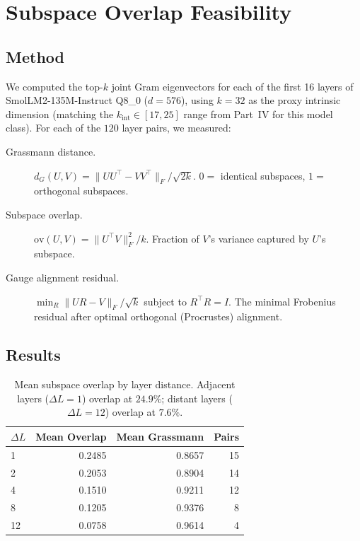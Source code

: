 \documentclass[11pt]{article}
\begin{document}
\section{Subspace Overlap Feasibility}
\label{sec:feasibility}

\subsection{Method}

We computed the top-$k$ joint Gram eigenvectors for each of the first
16 layers of SmolLM2-135M-Instruct Q8\_0 ($d{=}576$), using
$k{=}32$ as the proxy intrinsic dimension (matching the $k_{\mathrm{int}}
\in[17,25]$ range from Part~IV for this model class). For each of the
$120$ layer pairs, we measured:

\begin{description}
\item[Grassmann distance.] $d_G(U,V) = \|UU^\top - VV^\top\|_F / \sqrt{2k}$.
 $0 =$ identical subspaces, $1 =$ orthogonal subspaces.

\item[Subspace overlap.] $\mathrm{ov}(U,V) = \|U^\top V\|_F^2 / k$.
 Fraction of $V$'s variance captured by $U$'s subspace.

\item[Gauge alignment residual.] $\min_R \|UR - V\|_F / \sqrt{k}$
 subject to $R^\top R = I$. The minimal Frobenius residual after
 optimal orthogonal (Procrustes) alignment.
\end{description}

\subsection{Results}

\begin{table}[h]\centering\small
\caption{Mean subspace overlap by layer distance. Adjacent layers
($\Delta L{=}1$) overlap at $24.9\%$; distant layers ($\Delta L{=}12$)
overlap at $7.6\%$.}
\label{tab:overlap-by-distance}
\begin{tabular}{@{}lrrr@{}}
\toprule
$\Delta L$ & Mean Overlap & Mean Grassmann & Pairs \\
\midrule
1 & 0.2485 & 0.8657 & 15 \\
2 & 0.2053 & 0.8904 & 14 \\
4 & 0.1510 & 0.9211 & 12 \\
8 & 0.1205 & 0.9376 & 8 \\
12 & 0.0758 & 0.9614 & 4 \\
\bottomrule
\end{tabular}
\end{table}
\end{document}
